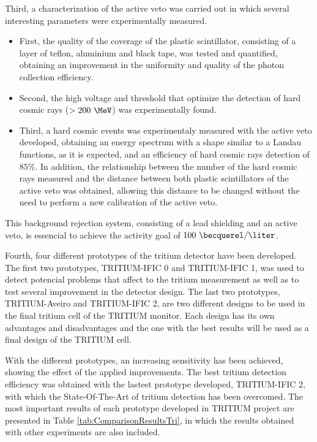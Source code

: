 Third, a characterization of the active veto was carried out in which several interesting parameters were experimentally measured.

\begin{itemize}

\item{} First, the quality of the coverage of the plastic scintillator, consisting of a layer of teflon, aluminium and black tape, was tested and quantified, obtaining an improvement in the uniformity and quality of the photon collection efficiency.

\item{} Second, the high voltage and threshold that optimize the detection of hard cosmic rays ($>200~\MeV$) was experimentally found.

\item{} Third, a hard cosmic events was experimentaly measured with the active veto developed, obtaining an energy spectrum with a shape similar to a Landau functions, as it is expected, and an efficiency of hard cosmic rays detection of $85\%$. In addition, the relationship between the number of the hard cosmic rays measured and the distance between both plastic scintillators of the active veto was obtained, allowing this distance to be changed without the need to perform a new calibration of the active veto.

\end{itemize}

This background rejection system, consisting of a lead shielding and an active veto, is essencial to achieve the activity goal of $100~\becquerel/\liter$.

Fourth, four different prototypes of the tritium detector have been developed. The first two prototypes, TRITIUM-IFIC 0 and TRITIUM-IFIC 1, was used to detect potencial problems that affect to the tritium measurement as well as to test several improvement in the detector design. The last two prototypes, TRITIUM-Aveiro and TRITIUM-IFIC 2, are two different designs to be used in the final tritium cell of the TRITIUM monitor. Each design has its own advantages and disadvantages and the one with the best results will be used as a final design of the TRITIUM cell.

With the different prototypes, an increasing sensitivity has been achieved, showing the effect of the applied improvements. The best tritium detection efficiency was obtained with the lastest prototype developed, TRITIUM-IFIC 2, with which the State-Of-The-Art of tritium detection has been overcomed. The most important results of each prototype developed in TRITIUM project are presented in Table \ref{tab:ComparisonResultsTri}, in which the results obtained with other experiments are also included.

